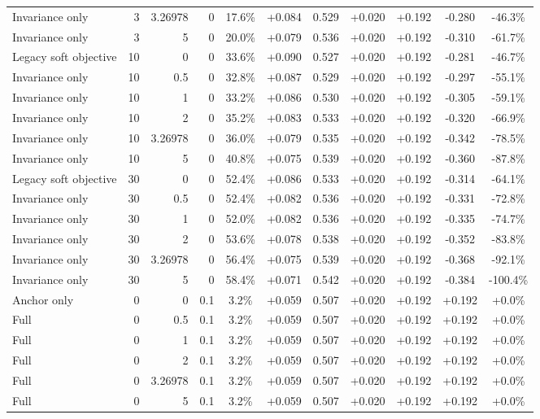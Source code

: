 \begin{table}[htbp]
\begin{tabular}{lrrrccccccc}
Invariance only & 3 & 3.26978 & 0 & 17.6\% & +0.084 & 0.529 & +0.020 & +0.192 & -0.280 & -46.3\% \\
Invariance only & 3 & 5 & 0 & 20.0\% & +0.079 & 0.536 & +0.020 & +0.192 & -0.310 & -61.7\% \\
Legacy soft objective & 10 & 0 & 0 & 33.6\% & +0.090 & 0.527 & +0.020 & +0.192 & -0.281 & -46.7\% \\
Invariance only & 10 & 0.5 & 0 & 32.8\% & +0.087 & 0.529 & +0.020 & +0.192 & -0.297 & -55.1\% \\
Invariance only & 10 & 1 & 0 & 33.2\% & +0.086 & 0.530 & +0.020 & +0.192 & -0.305 & -59.1\% \\
Invariance only & 10 & 2 & 0 & 35.2\% & +0.083 & 0.533 & +0.020 & +0.192 & -0.320 & -66.9\% \\
Invariance only & 10 & 3.26978 & 0 & 36.0\% & +0.079 & 0.535 & +0.020 & +0.192 & -0.342 & -78.5\% \\
Invariance only & 10 & 5 & 0 & 40.8\% & +0.075 & 0.539 & +0.020 & +0.192 & -0.360 & -87.8\% \\
Legacy soft objective & 30 & 0 & 0 & 52.4\% & +0.086 & 0.533 & +0.020 & +0.192 & -0.314 & -64.1\% \\
Invariance only & 30 & 0.5 & 0 & 52.4\% & +0.082 & 0.536 & +0.020 & +0.192 & -0.331 & -72.8\% \\
Invariance only & 30 & 1 & 0 & 52.0\% & +0.082 & 0.536 & +0.020 & +0.192 & -0.335 & -74.7\% \\
Invariance only & 30 & 2 & 0 & 53.6\% & +0.078 & 0.538 & +0.020 & +0.192 & -0.352 & -83.8\% \\
Invariance only & 30 & 3.26978 & 0 & 56.4\% & +0.075 & 0.539 & +0.020 & +0.192 & -0.368 & -92.1\% \\
Invariance only & 30 & 5 & 0 & 58.4\% & +0.071 & 0.542 & +0.020 & +0.192 & -0.384 & -100.4\% \\
Anchor only & 0 & 0 & 0.1 & 3.2\% & +0.059 & 0.507 & +0.020 & +0.192 & +0.192 & +0.0\% \\
Full & 0 & 0.5 & 0.1 & 3.2\% & +0.059 & 0.507 & +0.020 & +0.192 & +0.192 & +0.0\% \\
Full & 0 & 1 & 0.1 & 3.2\% & +0.059 & 0.507 & +0.020 & +0.192 & +0.192 & +0.0\% \\
Full & 0 & 2 & 0.1 & 3.2\% & +0.059 & 0.507 & +0.020 & +0.192 & +0.192 & +0.0\% \\
Full & 0 & 3.26978 & 0.1 & 3.2\% & +0.059 & 0.507 & +0.020 & +0.192 & +0.192 & +0.0\% \\
Full & 0 & 5 & 0.1 & 3.2\% & +0.059 & 0.507 & +0.020 & +0.192 & +0.192 & +0.0\% \\

\end{tabular}
\end{table}
